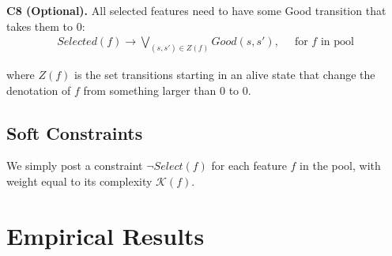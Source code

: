 \documentclass[a4paper]{article}
\newcommand{\smallpar}[1]{{\vspace{10pt}\noindent \bf #1.}}
\begin{document}
\smallpar{C8 (Optional)}
All selected features need to have some Good transition that takes them to $0$:
\begin{align}
 Selected(f) \rightarrow \bigvee_{(s, s') \in Z(f)} Good(s, s'),&\;\; \text{for $f$ in pool}
\end{align}

\noindent where $Z(f)$ is the set transitions starting in an alive state that change the denotation of $f$ from something
larger than 0 to 0.


\subsection{Soft Constraints}
We simply post a constraint $\neg Select(f)$ for each feature $f$ in the pool, with weight equal to its complexity $\mathcal{K}(f)$.

\section{Empirical Results}





\end{document}
